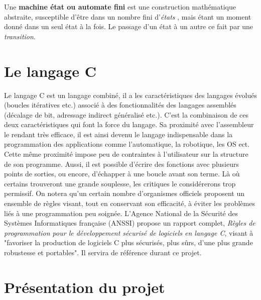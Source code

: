 \documentclass[a4paper]{article}
\begin{document}
Une\textbf{ machine état ou automate fini} est une construction mathématique abstraite, susceptible d'être dans un nombre fini d'\textit{états} , mais étant un moment donné dans un seul état à la fois. Le passage d'un état à un autre ce fait par une \textit{transition}. 

\newpage

\section{Le langage C}
Le langage C est un langage combiné, il a les caractéristiques des langages évolués (boucles itératives etc.) associé à des fonctionnalités des langages assemblés (décalage de bit, adressage indirect généralisé etc.). C'est la combinaison de ces deux caractéristiques qui font la force du langage\cite{Monteil2012}. Sa proximité avec l'assembleur le rendant très efficace, il est ainsi devenu le langage indispensable dans la programmation des applications comme l'automatique, la robotique, les OS ect. Cette même proximité impose peu de contraintes à l'utilisateur sur la structure de son programme. Aussi, il est possible d'écrire des fonctions avec plusieurs points de sorties, ou encore, d'échapper à une boucle avant son terme. Là où certains trouveront une grande souplesse, les critiques le considérerons trop permissif. On notera qu'un certain nombre d'organismes officiels proposent un ensemble de règles visant, tout en conservant son efficacité, à éviter les problèmes liés à une programmation peu soignée. L'Agence National de la Sécurité des Systèmes Informatiques française (ANSSI) propose un rapport complet, \textit{Règles de programmation pour le développement sécurisé de logiciels en langage C}\cite{ANSSI2021}, visant à "favoriser la production de logiciels C plus sécurisés, plus sûrs, d’une plus grande robustesse et portables". Il servira de référence durant ce projet.

\newpage
    \section{Présentation du projet}
\end{document}
